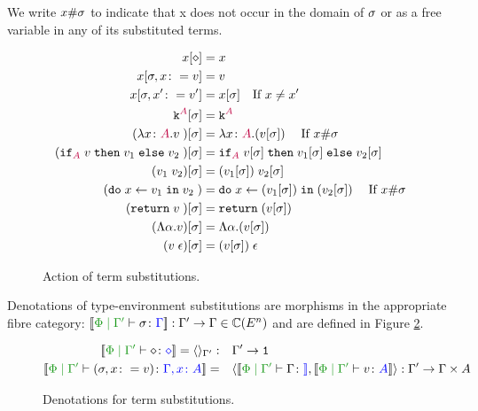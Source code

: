 \begin{framed}
    \begin{definition}[Freshness]
        We write $x\#\sigma$ to indicate that x does not occur in the domain of $\sigma$ or as a free variable in any of its substituted terms.
    \end{definition}
\end{framed}

\begin{figure}[H]
    \centering
    \begin{framed}
        \begin{align*}
            x[\diamond] & = x \\
            x[\sigma,x\colon= v] & = v \\
            x[\sigma,x'\colon= v'] & = x[\sigma]\quad\text{If }x \neq x'\\
            \texttt{k}^{\color{purple} A}[\sigma] & = \texttt{k}^{\color{purple} A} \\
            (\lambda x \colon {\color{purple}A}. v\;)[\sigma] &= \lambda x \colon {\color{purple}A}. (v[\sigma])\;\quad\text{If }x\#\sigma\\
            (\texttt{if}_{\textcolor{purple}{A}}\; v\; \texttt{then}\; v_1 \;\texttt{else} \; v_2\;)[\sigma] &= \texttt{if}_{\textcolor{purple}{A}}\; v[\sigma]\; \texttt{then}\; v_1[\sigma] \;\texttt{else} \; v_2[\sigma]\;\\
            (v_1\; v_2)[\sigma]&= (v_1[\sigma])\; v_2[\sigma]\\
            (\texttt{do}\; x \leftarrow v_1 \;\texttt{in}\; v_2\;)&= \texttt{do}\; x \leftarrow (v_1[\sigma]) \;\texttt{in}\; (v_2[\sigma])\;\quad\text{If } x\#\sigma\\
            (\texttt{return} \; v\;)[\sigma] & = \texttt{return} \;(v[\sigma])\; \\
            (\Lambda \alpha. v)[\sigma] & = \Lambda \alpha. (v[\sigma])\\
            (v\;\epsilon)[\sigma] & = (v[\sigma])\;\epsilon\\
        \end{align*}
            
    \end{framed}
    
    \caption{Action of term substitutions.}
    \label{TermSubstitutionAction}
\end{figure}


Denotations of type-environment substitutions are morphisms in the appropriate fibre category: $\deno{\etyperelation{\P}{\G'}{\si}{\G}}: \G' \rightarrow \G \in \C(E^n)$ and are defined in Figure \ref{TermSubstitutionDenotations}.

\begin{figure}[H]
    \centering
    \begin{framed}
\begin{align*}
    \deno{\etyperelation{\P}{\G'}{\nil}{\nil}} = \term{\G'}:&\quad \G' \rightarrow \1
    \\
    \deno{\etyperelation{\P}{\G'}{(\si, x \setto v)}{\gax}} =&\quad \pr{\deno{\etyperelation{\P}{\G'}{\G}}}{\deno{\etyperelation{\P}{\G'}{v}{A}}}: \G' \rightarrow \G\times A
\end{align*}
    \end{framed}
    \caption{Denotations for term substitutions.}
    \label{TermSubstitutionDenotations}
\end{figure}


